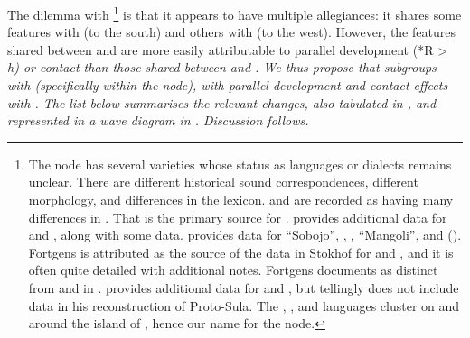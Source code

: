 The dilemma with \footnote{
		The  node
		has several varieties whose status as languages or dialects remains unclear.
		There are different historical sound correspondences,
		different morphology, and differences in the lexicon.
		 and  are recorded as having many differences in \citet{Fortgens1921}.
		That is the primary  source for \citet{Blust1981}.
		\citet{Collins1981,Collins1989} provides additional data for 
		and , along with some  data.
		\citet{Stokhof1980b} provides data for “Sobojo”,
		, , “Mangoli”, and  ().
		Fortgens is attributed as the source of the data in Stokhof for
		 and , and it is often quite detailed with additional notes.
		Fortgens documents  as distinct from 
		and  in \citet{Stokhof1980b}.
		\citet{Bloyd2015,Bloyd2020} provides additional data for 
		and , but tellingly does not include  data
		in his reconstruction of Proto-Sula.
		The , , and  languages cluster on
		and around the island of ,
		hence our name for the node.}
is that it appears to have multiple
allegiances: it shares some features with  (to
the south) and others with  (to the west).
However, the features shared between 
and  are more easily attributable to parallel
development (*R > \it{h}) or  contact than those shared between
 and .
We thus propose that  subgroups with 
(specifically within the  node),
with parallel development and contact effects with .
The list below summarises the relevant changes,
also tabulated in , and represented in a wave diagram in .
Discussion follows.

